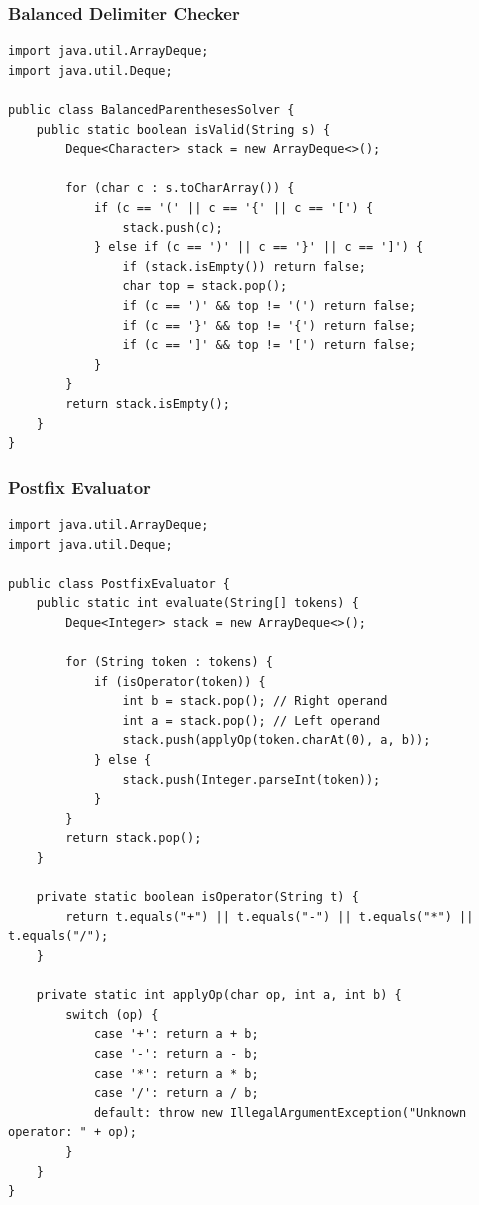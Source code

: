 \documentclass[10pt,journal,compsoc,onecolumn]{IEEEtran}
\begin{document}
\subsubsection{Balanced Delimiter Checker}
{\footnotesize
\begin{verbatim}
import java.util.ArrayDeque;
import java.util.Deque;

public class BalancedParenthesesSolver {
    public static boolean isValid(String s) {
        Deque<Character> stack = new ArrayDeque<>();

        for (char c : s.toCharArray()) {
            if (c == '(' || c == '{' || c == '[') {
                stack.push(c);
            } else if (c == ')' || c == '}' || c == ']') {
                if (stack.isEmpty()) return false;
                char top = stack.pop();
                if (c == ')' && top != '(') return false;
                if (c == '}' && top != '{') return false;
                if (c == ']' && top != '[') return false;
            }
        }
        return stack.isEmpty();
    }
}
\end{verbatim}
}

\subsubsection{Postfix Evaluator}
{\footnotesize
\begin{verbatim}
import java.util.ArrayDeque;
import java.util.Deque;

public class PostfixEvaluator {
    public static int evaluate(String[] tokens) {
        Deque<Integer> stack = new ArrayDeque<>();

        for (String token : tokens) {
            if (isOperator(token)) {
                int b = stack.pop(); // Right operand
                int a = stack.pop(); // Left operand
                stack.push(applyOp(token.charAt(0), a, b));
            } else {
                stack.push(Integer.parseInt(token));
            }
        }
        return stack.pop();
    }

    private static boolean isOperator(String t) {
        return t.equals("+") || t.equals("-") || t.equals("*") || t.equals("/");
    }

    private static int applyOp(char op, int a, int b) {
        switch (op) {
            case '+': return a + b;
            case '-': return a - b;
            case '*': return a * b;
            case '/': return a / b;
            default: throw new IllegalArgumentException("Unknown operator: " + op);
        }
    }
}
\end{verbatim}
}
\end{document}
